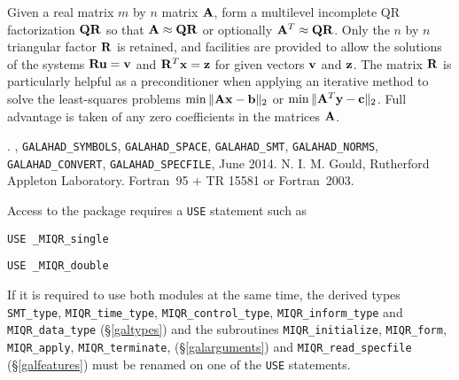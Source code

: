 \documentclass{galahad}
\newcommand{\packagename}{MIQR}
\newcommand{\fullpackagename}{\libraryname\_\packagename}
\begin{document}
\galheader


\galsummary
Given a real matrix $m$ by $n$ matrix ${\mathbf{A}}$, form a multilevel
incomplete QR factorization ${\mathbf{Q}} {\mathbf{R}}$ so that ${\mathbf{A}} \approx {\mathbf{Q}}{\mathbf{R}}$ or
optionally ${\mathbf{A}}^T \approx {\mathbf{Q}}{\mathbf{R}}$.
Only the $n$ by $n$ triangular factor ${\mathbf{R}}$ is retained, and facilities
are provided to allow the solutions of the systems ${\mathbf{R}} {\mathbf{u}} = {\mathbf{v}}$ and
${\mathbf{R}}^T {\mathbf{x}} = {\mathbf{z}}$
for given vectors ${\mathbf{v}}$ and ${\mathbf{z}}$. The matrix ${\mathbf{R}}$ is particularly helpful
as a preconditioner when applying an iterative method to solve the
least-squares problems $\min \|{\mathbf{A}}{\mathbf{x}}-{\mathbf{b}}\|_2$ or
$\min \|{\mathbf{A}}^T{\mathbf{y}}-{\mathbf{c}}\|_2$.
Full advantage is taken of any zero coefficients in the matrices ${\mathbf{A}}$.


\galattributes
\galversions{\tt  \fullpackagename\_single, \fullpackagename\_double}.
,
{\tt GALAHAD\_\-SY\-M\-BOLS},
{\tt GALAHAD\-\_SPACE},
{\tt GALAHAD\_SMT},
{\tt GALAHAD\_NORMS},
{\tt GALAHAD\_CONVERT},
{\tt GALAHAD\_SPECFILE},
\galdate June 2014.
\galorigin N. I. M. Gould,
Rutherford Appleton Laboratory.
\gallanguage Fortran~95 + TR 15581 or Fortran~2003.


\galhowto


Access to the package requires a {\tt USE} statement such as

\medskip{}

\hspace{8mm} {\tt USE \fullpackagename\_single}

\medskip{}

\hspace{8mm} {\tt USE  \fullpackagename\_double}

\medskip

\noindent
If it is required to use both modules at the same time, the derived types
{\tt SMT\_type},
{\tt \packagename\_time\_type},
{\tt \packagename\_control\_type},
{\tt \packagename\_inform\_type}
and
{\tt \packagename\_data\_type}
(\S\ref{galtypes})
and the subroutines
{\tt \packagename\_initialize},
{\tt \packagename\_\-form},
{\tt \packagename\_\-apply},
{\tt \packagename\_terminate},
(\S\ref{galarguments})
and
{\tt \packagename\_read\_specfile}
(\S\ref{galfeatures})
must be renamed on one of the {\tt USE} statements.
\end{document}

